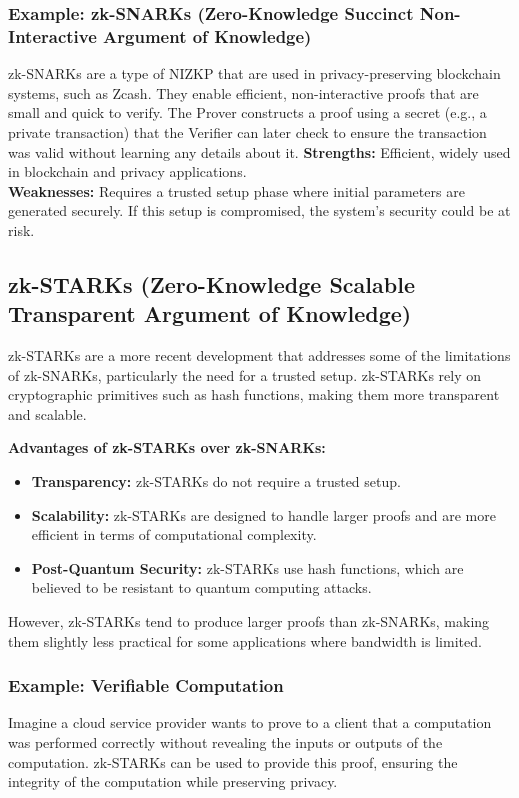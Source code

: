 \subsubsection{Example: zk-SNARKs (Zero-Knowledge Succinct Non-Interactive Argument of Knowledge)}
zk-SNARKs are a type of NIZKP that are used in privacy-preserving blockchain systems, such as Zcash. They enable efficient, non-interactive proofs that are small and quick to verify. The Prover constructs a proof using a secret (e.g., a private transaction) that the Verifier can later check to ensure the transaction was valid without learning any details about it.
\justify
\textbf{Strengths:} Efficient, widely used in blockchain and privacy applications.\\
\textbf{Weaknesses:} Requires a trusted setup phase where initial parameters are generated securely. If this setup is compromised, the system’s security could be at risk.

\subsection{zk-STARKs (Zero-Knowledge Scalable Transparent Argument of Knowledge)}
zk-STARKs are a more recent development that addresses some of the limitations of zk-SNARKs, particularly the need for a trusted setup. zk-STARKs rely on cryptographic primitives such as hash functions, making them more transparent and scalable.

\textbf{Advantages of zk-STARKs over zk-SNARKs:}
\begin{itemize}
    \item \textbf{Transparency:} zk-STARKs do not require a trusted setup.
    \item \textbf{Scalability:} zk-STARKs are designed to handle larger proofs and are more efficient in terms of computational complexity.
    \item \textbf{Post-Quantum Security:} zk-STARKs use hash functions, which are believed to be resistant to quantum computing attacks.
\end{itemize}

However, zk-STARKs tend to produce larger proofs than zk-SNARKs, making them slightly less practical for some applications where bandwidth is limited.

\subsubsection{Example: Verifiable Computation}
Imagine a cloud service provider wants to prove to a client that a computation was performed correctly without revealing the inputs or outputs of the computation. zk-STARKs can be used to provide this proof, ensuring the integrity of the computation while preserving privacy.

